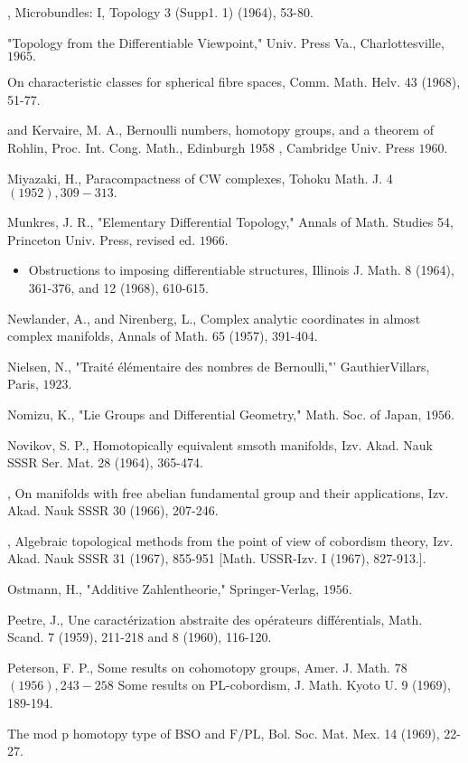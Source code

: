 \documentclass[10pt]{article}
\begin{document}
, Microbundles: I, Topology 3 (Supp1. 1) (1964), 53-80.

"Topology from the Differentiable Viewpoint," Univ. Press Va., Charlottesville, $1965 .$

On characteristic classes for spherical fibre spaces, Comm. Math. Helv. 43 (1968), 51-77.

and Kervaire, M. A., Bernoulli numbers, homotopy groups, and a theorem of Rohlin, Proc. Int. Cong. Math., Edinburgh 1958 , Cambridge Univ. Press $1960 .$

Miyazaki, H., Paracompactness of CW complexes, Tohoku Math. J. 4 $(1952), 309-313 .$

Munkres, J. R., "Elementary Differential Topology," Annals of Math. Studies 54, Princeton Univ. Press, revised ed. $1966 .$

\begin{itemize}
  \item Obstructions to imposing differentiable structures, Illinois J. Math. 8 (1964), 361-376, and 12 (1968), 610-615.
\end{itemize}
Newlander, A., and Nirenberg, L., Complex analytic coordinates in almost complex manifolds, Annals of Math. 65 (1957), 391-404.

Nielsen, N., "Traité élémentaire des nombres de Bernoulli,"' GauthierVillars, Paris, $1923 .$

Nomizu, K., "Lie Groups and Differential Geometry," Math. Soc. of Japan, $1956 .$

Novikov, S. P., Homotopically equivalent smsoth manifolds, Izv. Akad. Nauk SSSR Ser. Mat. 28 (1964), 365-474.

, On manifolds with free abelian fundamental group and their applications, Izv. Akad. Nauk SSSR 30 (1966), 207-246.

, Algebraic topological methods from the point of view of cobordism theory, Izv. Akad. Nauk SSSR 31 (1967), 855-951 [Math. USSR-Izv. I (1967), 827-913.].

Ostmann, H., "Additive Zahlentheorie," Springer-Verlag, $1956 .$

Peetre, J., Une caractérization abstraite des opérateurs différentials, Math. Scand. 7 (1959), 211-218 and 8 (1960), 116-120.

Peterson, F. P., Some results on cohomotopy groups, Amer. J. Math. 78 $(1956), 243-258$ Some results on PL-cobordism, J. Math. Kyoto U. 9 (1969), 189-194.

The mod $\mathrm{p}$ homotopy type of $\mathrm{BSO}$ and $\mathrm{F} / \mathrm{PL}$, Bol. Soc. Mat. Mex. 14 (1969), 22-27.
\end{document}

